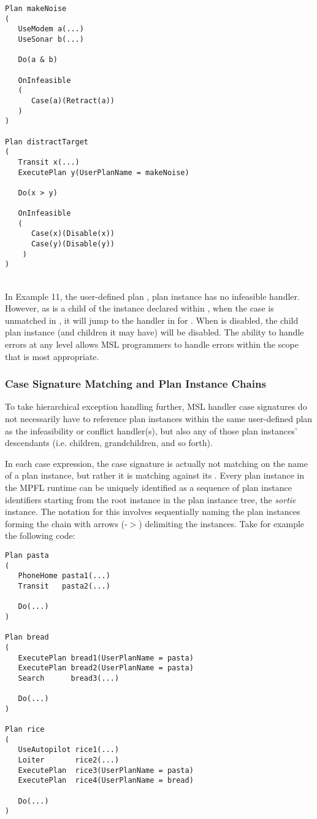 \begin{verbatim}
Plan makeNoise
(
   UseModem a(...)
   UseSonar b(...)
   
   Do(a & b)
   
   OnInfeasible
   (
      Case(a)(Retract(a))
   )
)

Plan distractTarget
(
   Transit x(...)
   ExecutePlan y(UserPlanName = makeNoise)
   
   Do(x > y)

   OnInfeasible
   (
      Case(x)(Disable(x))
      Case(y)(Disable(y))		
 	)      
)
\end{verbatim}
\\

In Example 11, the user-defined plan , plan instance  has no infeasible handler. However, as  is a child of the instance  declared within , when the case is unmatched in , it will jump to the handler in  for . When  is disabled, the child plan instance  (and children it may have) will be disabled. The ability to handle errors at any level allows MSL programmers to handle errors within the scope that is most appropriate.

\subsubsection{Case Signature Matching and Plan Instance Chains}
To take hierarchical exception handling further, MSL handler case signatures do not necessarily have to reference plan instances within the same user-defined plan as the infeasibility or conflict handler(s), but also any of those plan instances' descendants (i.e. children, grandchildren, and so forth). 

In each case expression, the case signature is actually not matching on the name of a plan instance, but rather it is matching against its . Every plan instance in the MPFL runtime can be uniquely identified as a sequence of plan instance identifiers starting from the root instance in the plan instance tree, the \emph{sortie} instance. The notation for this involves sequentially naming the plan instances forming the chain with arrows (-$>$) delimiting the instances. Take for example the following code:

\begin{verbatim}
Plan pasta
(
   PhoneHome pasta1(...)
   Transit   pasta2(...)
   
   Do(...)
)

Plan bread
(
   ExecutePlan bread1(UserPlanName = pasta)
   ExecutePlan bread2(UserPlanName = pasta)
   Search      bread3(...)

   Do(...)
)

Plan rice
(
   UseAutopilot rice1(...)
   Loiter       rice2(...)
   ExecutePlan  rice3(UserPlanName = pasta)   
   ExecutePlan  rice4(UserPlanName = bread)      
   
   Do(...)
)
\end{verbatim}
\\

